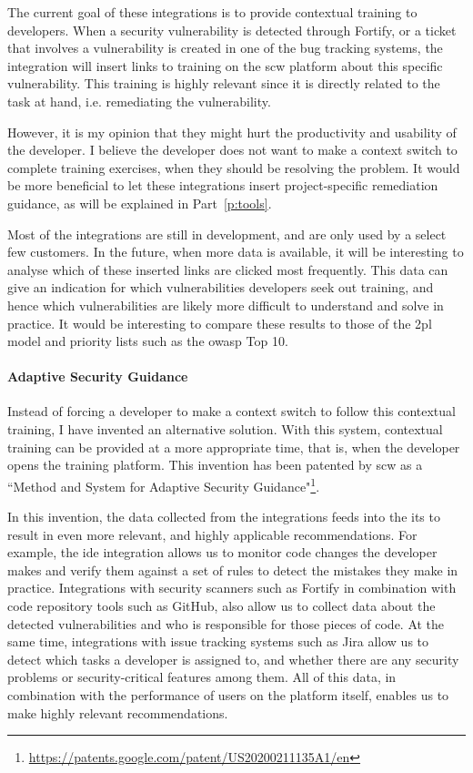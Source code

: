 The current goal of these integrations is to provide contextual training to developers.
When a security vulnerability is detected through Fortify, or a ticket that involves a vulnerability is created in one of the bug tracking systems, the integration will insert links to training on the \gls{scw} platform about this specific vulnerability.
This training is highly relevant since it is directly related to the task at hand, i.e. remediating the vulnerability.

However, it is my opinion that they might hurt the productivity and usability of the developer.
I believe the developer does not want to make a context switch to complete training exercises, when they should be resolving the problem.
It would be more beneficial to let these integrations insert project-specific remediation guidance, as will be explained in Part~\ref{p:tools}.

Most of the integrations are still in development, and are only used by a select few customers.
In the future, when more data is available, it will be interesting to analyse which of these inserted links are clicked most frequently.
This data can give an indication for which vulnerabilities developers seek out training, and hence which vulnerabilities are likely more difficult to understand and solve in practice.
It would be interesting to compare these results to those of the \gls{2pl} model and priority lists such as the \gls{owasp} Top 10.

\paragraph{Adaptive Security Guidance}
Instead of forcing a developer to make a context switch to follow this contextual training, I have invented an alternative solution.
With this system, contextual training can be provided at a more appropriate time, that is, when the developer opens the training platform.
This invention has been patented by \gls{scw} as a ``Method and System for Adaptive Security Guidance"\footnote{\url{https://patents.google.com/patent/US20200211135A1/en}}.

In this invention, the data collected from the integrations feeds into the \gls{its} to result in even more relevant, and highly applicable recommendations.
For example, the \gls{ide} integration allows us to monitor code changes the developer makes and verify them against a set of rules to detect the mistakes they make in practice.
Integrations with security scanners such as Fortify in combination with code repository tools such as GitHub, also allow us to collect data about the detected vulnerabilities and who is responsible for those pieces of code.
At the same time, integrations with issue tracking systems such as Jira allow us to detect which tasks a developer is assigned to, and whether there are any security problems or security-critical features among them.
All of this data, in combination with the performance of users on the platform itself, enables us to make highly relevant recommendations.


